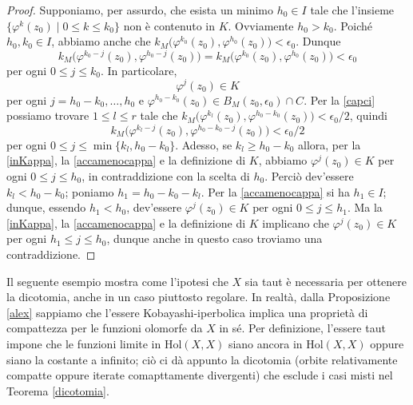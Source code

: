 \begin{proof}
    Supponiamo, per assurdo, che esista un minimo $h_0 \in I$ tale che l'insieme $\{\varphi^k(z_0)\mid 0\le k\le k_0\}$ non è contenuto in $K$. Ovviamente $h_0>k_0$. Poiché $h_0,k_0 \in I$, abbiamo anche che $k_M\big(\varphi^{k_0}(z_0),\varphi^{h_0}(z_0)\big)<\epsilon_0$. Dunque
    $$k_M\big(\varphi^{k_0-j}(z_0),\varphi^{h_0-j}(z_0)\big)=k_M\big(\varphi^{k_0}(z_0),\varphi^{h_0}(z_0)\big)<\epsilon_0$$
    per ogni $0 \le j \le k_0$. In particolare,
    \begin{equation} \label{inKappa}
        \varphi^j(z_0) \in K
    \end{equation}
    per ogni $j=h_0-k_0,\dots,h_0$ e $\varphi^{h_0-k_0}(z_0)\in B_M(z_0,\epsilon_0)\cap C$. Per la \eqref{capci} possiamo trovare $1 \le l \le r$ tale che $k_M\big(\varphi^{k_l}(z_0),\varphi^{h_0-k_0}(z_0)\big)<\epsilon_0/2$, quindi
    \begin{equation} \label{accamenocappa}
        k_M\big(\varphi^{k_l-j}(z_0),\varphi^{h_0-k_0-j}(z_0)\big)<\epsilon_0/2
    \end{equation}
    per ogni $0 \le j \le \min\{k_l,h_0-k_0\}$. Adesso, se $k_l \ge h_0-k_0$ allora, per la \eqref{inKappa}, la \eqref{accamenocappa} e la definizione di $K$, abbiamo $\varphi^j(z_0) \in K$ per ogni $0 \le j \le h_0$, in contraddizione con la scelta di $h_0$. Perciò dev'essere $k_l<h_0-k_0$; poniamo $h_1=h_0-k_0-k_l$. Per la \eqref{accamenocappa} si ha $h_1 \in I$; dunque, essendo $h_1<h_0$, dev'essere $\varphi^j(z_0) \in K$ per ogni $0 \le j \le h_1$. Ma la \eqref{inKappa}, la \eqref{accamenocappa} e la definizione di $K$ implicano che $\varphi^j(z_0) \in K$ per ogni $h_1 \le j \le h_0$, dunque anche in questo caso troviamo una contraddizione.
\end{proof}

Il seguente esempio mostra come l'ipotesi che $X$ sia taut è necessaria per ottenere la dicotomia, anche in un caso piuttosto regolare. In realtà, dalla Proposizione \ref{alex} sappiamo che l'essere Kobayashi-iperbolica implica una proprietà di compattezza per le funzioni olomorfe da $X$ in sé. Per definizione, l'essere taut impone che le funzioni limite in $\text{Hol}(X,X)$ siano ancora in $\text{Hol}(X,X)$ oppure siano la costante a infinito; ciò ci dà appunto la dicotomia (orbite relativamente compatte oppure iterate comapttamente divergenti) che esclude i casi misti nel Teorema \ref{dicotomia}.

